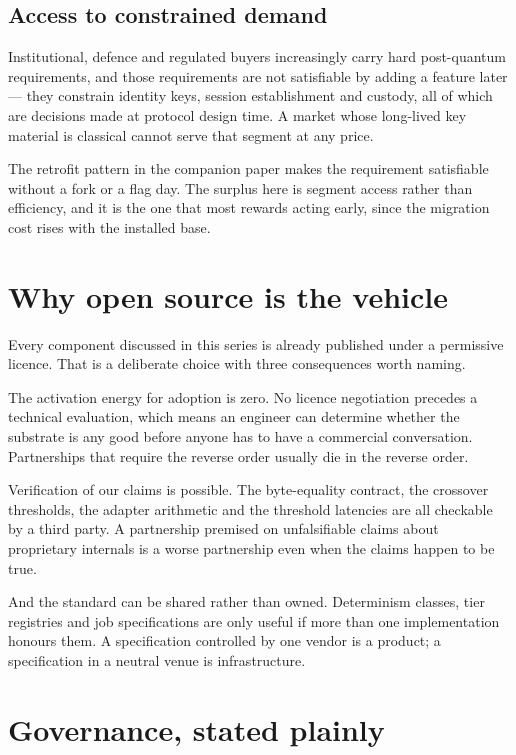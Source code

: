 \documentclass[11pt,a4paper]{article}
\begin{document}
\subsection{Access to constrained demand}

Institutional, defence and regulated buyers increasingly carry hard post-quantum
requirements, and those requirements are not satisfiable by adding a feature
later --- they constrain identity keys, session establishment and custody, all of
which are decisions made at protocol design time. A market whose long-lived key
material is classical cannot serve that segment at any price.

The retrofit pattern in the companion paper makes the requirement satisfiable
without a fork or a flag day. The surplus here is segment access rather than
efficiency, and it is the one that most rewards acting early, since the migration
cost rises with the installed base.

\section{Why open source is the vehicle}

Every component discussed in this series is already published under a permissive
licence. That is a deliberate choice with three consequences worth naming.

The activation energy for adoption is zero. No licence negotiation precedes a
technical evaluation, which means an engineer can determine whether the substrate
is any good before anyone has to have a commercial conversation. Partnerships that
require the reverse order usually die in the reverse order.

Verification of our claims is possible. The byte-equality contract, the crossover
thresholds, the adapter arithmetic and the threshold latencies are all checkable
by a third party. A partnership premised on unfalsifiable claims about
proprietary internals is a worse partnership even when the claims happen to be
true.

And the standard can be shared rather than owned. Determinism classes, tier
registries and job specifications are only useful if more than one implementation
honours them. A specification controlled by one vendor is a product; a
specification in a neutral venue is infrastructure.

\section{Governance, stated plainly}
\end{document}
